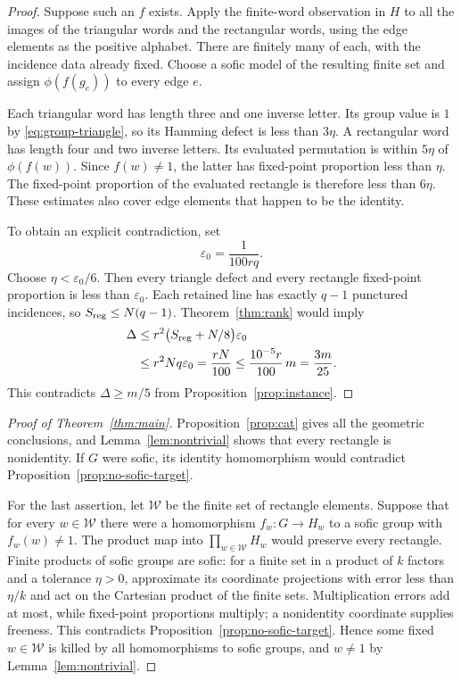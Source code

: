 \documentclass[11pt]{amsart}
\theoremstyle{definition}
\theoremstyle{remark}
\numberwithin{equation}{section}
\newcommand{\eps}{\varepsilon}
\begin{document}
\begin{proof}
Suppose such an $f$ exists. Apply the finite-word observation in
$H$ to all the images of the triangular words and the rectangular
words, using the edge elements as the positive alphabet. There
are finitely many of each, with the incidence data already fixed.
Choose a sofic model of the resulting finite set and assign
$\phi(f(g_e))$ to every edge $e$.

Each triangular word has length three and one inverse letter.
Its group value is $1$ by \eqref{eq:group-triangle}, so its
Hamming defect is less than $3\eta$. A rectangular word has
length four and two inverse letters. Its evaluated permutation
is within $5\eta$ of $\phi(f(w))$. Since $f(w)\ne1$, the latter
has fixed-point proportion less than $\eta$. The fixed-point
proportion of the evaluated rectangle is therefore less than
$6\eta$. These estimates also cover edge elements that happen
to be the identity.

To obtain an explicit contradiction, set
\begin{equation}\label{eq:tolerance}
 \eps_0=\frac{1}{100rq}.
\end{equation}
Choose $\eta<\eps_0/6$. Then every triangle defect and every
rectangle fixed-point proportion is less than $\eps_0$.
Each retained line has exactly $q-1$ punctured incidences, so
$S_{\rm reg}\le N(q-1)$. Theorem~\ref{thm:rank} would imply
\begin{align*}
 \Delta
 &\le r^2\bigl(S_{\rm reg}+N/8\bigr)\eps_0\\
 &\le r^2Nq\eps_0
 =\frac{rN}{100}
 \le\frac{10^{-5}r}{100}\,m
 =\frac{3m}{25}.
\end{align*}
This contradicts $\Delta\ge m/5$ from
Proposition~\ref{prop:instance}.
\end{proof}

\begin{proof}[Proof of Theorem~\ref{thm:main}]
Proposition~\ref{prop:cat} gives all the geometric conclusions,
and Lemma~\ref{lem:nontrivial} shows that every rectangle is
nonidentity. If $G$ were sofic, its identity homomorphism would
contradict Proposition~\ref{prop:no-sofic-target}.

For the last assertion, let $\mathcal W$ be the finite set of
rectangle elements. Suppose that for every $w\in\mathcal W$ there
were a homomorphism $f_w:G\to H_w$ to a sofic group with
$f_w(w)\ne1$. The product map into $\prod_{w\in\mathcal W}H_w$
would preserve every rectangle. Finite products of sofic groups
are sofic: for a finite set in a product of $k$ factors and a
tolerance $\eta>0$, approximate its coordinate projections with
error less than $\eta/k$ and act on the Cartesian product of the
finite sets. Multiplication errors add at most, while fixed-point
proportions multiply; a nonidentity coordinate supplies freeness.
This
contradicts Proposition~\ref{prop:no-sofic-target}. Hence some
fixed $w\in\mathcal W$ is killed by all homomorphisms to sofic
groups, and $w\ne1$ by Lemma~\ref{lem:nontrivial}.
\end{proof}
\end{document}
